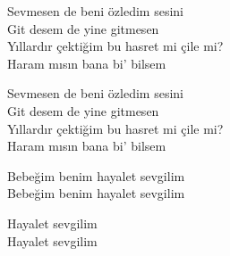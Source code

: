 \documentclass[twocolumn]{article}
\begin{document}
Sevmesen de beni \"{o}zledim sesini\\
Git desem de yine gitmesen\\
Y{\i}llard{\i}r \c{c}ekti\u{g}im bu hasret mi \c{c}ile mi?\\
Haram m{\i}s{\i}n bana bi' bilsem

Sevmesen de beni \"{o}zledim sesini\\
Git desem de yine gitmesen\\
Y{\i}llard{\i}r \c{c}ekti\u{g}im bu hasret mi \c{c}ile mi?\\
Haram m{\i}s{\i}n bana bi' bilsem

Bebe\u{g}im benim hayalet sevgilim\\
Bebe\u{g}im benim hayalet sevgilim

Hayalet sevgilim\\
Hayalet sevgilim
\end{document}
